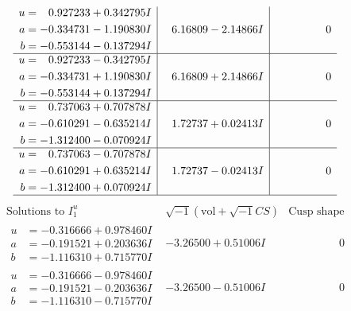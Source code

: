 \documentclass[1p]{elsarticle_modified}
\theoremstyle{definition}
\newcommand{\I}{\sqrt{-1}}
\begin{document}
$$\begin{array}{c|c|c}
\begin{aligned}
u &= \phantom{-}0.927233 + 0.342795 I \\
a &= -0.334731 - 1.190830 I \\
b &= -0.553144 - 0.137294 I\end{aligned}
 & \phantom{-}6.16809 - 2.14866 I & \phantom{-0.000000 } 0 \\ \hline\begin{aligned}
u &= \phantom{-}0.927233 - 0.342795 I \\
a &= -0.334731 + 1.190830 I \\
b &= -0.553144 + 0.137294 I\end{aligned}
 & \phantom{-}6.16809 + 2.14866 I & \phantom{-0.000000 } 0 \\ \hline\begin{aligned}
u &= \phantom{-}0.737063 + 0.707878 I \\
a &= -0.610291 - 0.635214 I \\
b &= -1.312400 - 0.070924 I\end{aligned}
 & \phantom{-}1.72737 + 0.02413 I & \phantom{-0.000000 } 0 \\ \hline\begin{aligned}
u &= \phantom{-}0.737063 - 0.707878 I \\
a &= -0.610291 + 0.635214 I \\
b &= -1.312400 + 0.070924 I\end{aligned}
 & \phantom{-}1.72737 - 0.02413 I & \phantom{-0.000000 } 0\\
 \hline 
 \end{array}$$\newpage$$\begin{array}{c|c|c}  
\text{Solutions to }I^u_{1}& \I (\text{vol} + \sqrt{-1}CS) & \text{Cusp shape}\\
 \hline 
\begin{aligned}
u &= -0.316666 + 0.978460 I \\
a &= -0.191521 + 0.203636 I \\
b &= -1.116310 + 0.715770 I\end{aligned}
 & -3.26500 + 0.51006 I & \phantom{-0.000000 } 0 \\ \hline\begin{aligned}
u &= -0.316666 - 0.978460 I \\
a &= -0.191521 - 0.203636 I \\
b &= -1.116310 - 0.715770 I\end{aligned}
 & -3.26500 - 0.51006 I & \phantom{-0.000000 } 0 \\ \hline\begin{aligned}

\end{aligned}
\end{array}$$
\end{document}
